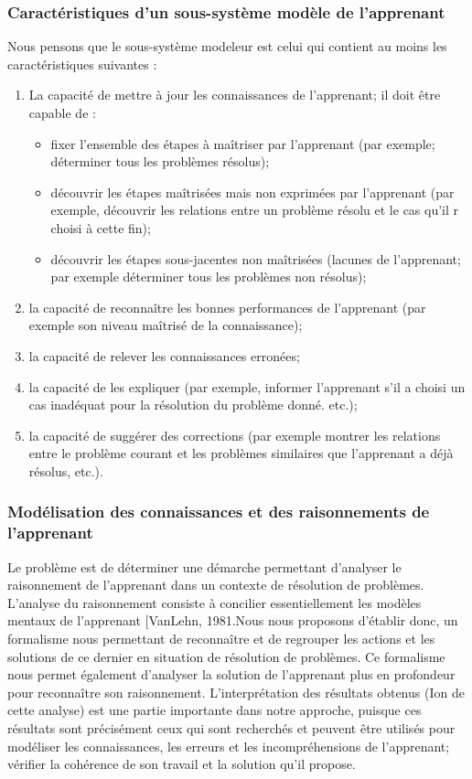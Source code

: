 \subsubsection{Caractéristiques d'un sous-système modèle de l'apprenant }
Nous pensons que le sous-système modeleur est celui qui contient au moins les
caractéristiques suivantes :

\begin{enumerate}
\item La capacité de mettre à jour les connaissances de l'apprenant; il doit être capable de  : \begin{itemize}
\item fixer l'ensemble des étapes à maîtriser par l'apprenant (par exemple; déterminer
tous les problèmes résolus);
\item découvrir les étapes maîtrisées mais non exprimées par l'apprenant (par exemple, découvrir les relations entre un problème résolu et le cas qu'il r choisi à cette fin);
\item découvrir les étapes sous-jacentes non maîtrisées (lacunes de l'apprenant; par exemple déterminer tous les problèmes non résolus);
\end{itemize}
\item la capacité de reconnaître les bonnes performances de l'apprenant (par exemple son niveau maîtrisé de la connaissance);
\item la capacité de relever les connaissances erronées;
\item la capacité de les expliquer (par exemple, informer l'apprenant s'il a choisi un cas inadéquat pour la résolution du problème donné. etc.);
\item  la capacité de suggérer des corrections (par exemple montrer les relations entre le problème courant et les problèmes similaires que l'apprenant a déjà résolus, etc.). 
\end{enumerate}


\subsubsection{Modélisation des connaissances et des raisonnements de
l'apprenant }
Le problème est de déterminer une démarche permettant d'analyser le raisonnement de
l'apprenant dans un contexte de résolution de problèmes. L'analyse du raisonnement
consiste à concilier essentiellement les modèles mentaux de l'apprenant [VanLehn, 1981.Nous nous proposons d'établir donc, un formalisme nous permettant de reconnaître et de regrouper les actions et les solutions de ce dernier en situation de résolution de problèmes. Ce formalisme nous permet également d'analyser la solution de l'apprenant plus en profondeur pour reconnaître son raisonnement. L'interprétation des résultats obtenus (Ion de cette analyse) est une partie importante dans notre approche, puisque ces résultats sont précisément ceux qui sont recherchés et peuvent être utilisés pour modéliser les connaissances, les erreurs et les incompréhensions de l'apprenant; vérifier la cohérence de son travail et la solution qu'il propose. 

